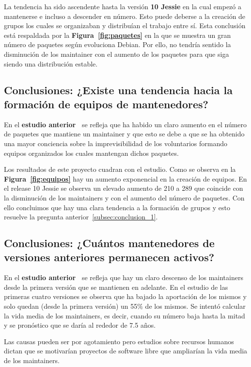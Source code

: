 \documentclass[a4paper, 12pt]{book}
\begin{document}
La tendencia ha sido ascendente hasta la versión \textbf{10 Jessie} en la cual empezó a mantenerse e incluso a descender en número. Esto puede deberse a la creación de grupos los cuales se organizaban y distribuían el trabajo entre sí. Esta conclusión está respaldada por la \textbf{Figura~\ref{fig:paquetes}} en la que se muestra un gran número de paquetes según evoluciona Debian. Por ello, no tendría sentido la disminución de los maintainer con el aumento de los paquetes para que siga siendo una distribución estable. 

\subsection{Conclusiones: ¿Existe una tendencia hacia la formación de equipos de mantenedores?}
\label{subsec:conclusion_2}
En el \textbf{estudio anterior~\cite{robles05:_debian}} se refleja que ha habido un claro aumento en el número de paquetes que mantiene un maintainer y que esto se debe a que se ha obtenido una mayor conciencia sobre la imprevisibilidad de los voluntarios formando equipos organizados los cuales mantengan dichos paquetes.

Los resultados de este proyecto cuadran con el estudio. Como se observa en la \textbf{Figura~\ref{fig:equipos}} hay un aumento exponencial en la creación de equipos. En el release 10 Jessie se observa un elevado aumento de 210 a 289 que coincide con la disminución de los maintainers y con el aumento del número de paquetes. Con ello concluimos que hay una clara tendencia a la formación de grupos y esto resuelve la pregunta anterior~\ref{subsec:conclusion_1}.

\subsection{Conclusiones: ¿Cuántos mantenedores de versiones anteriores permanecen activos?}
\label{subsec:conclusion_3}
En el \textbf{estudio anterior~\cite{robles05:_debian}} se refleja que hay un claro descenso de los maintainers desde la primera versión que se mantienen en adelante. 
En el estudio de las primeras cuatro versiones se observa que ha bajado la aportación de los mismos y solo quedan (desde la primera versión) un 55\% de los mismos. Se intentó calcular la vida media de los maintainers, es decir, cuando su número baja hasta la mitad y se pronóstico que se daría al rededor de 7.5 años.

Las causas pueden ser por agotamiento pero estudios sobre recursos humanos dictan que se motivarían proyectos de software libre que ampliarían la vida media de los maintainers. 
\end{document}
